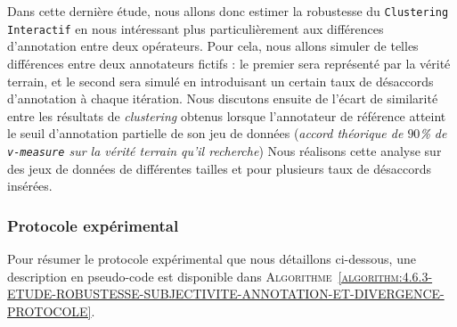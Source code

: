 		Dans cette dernière étude, nous allons donc estimer la robustesse du \texttt{Clustering Interactif} en nous intéressant plus particulièrement aux différences d'annotation entre deux opérateurs.
		Pour cela, nous allons simuler de telles différences entre deux annotateurs fictifs : le premier sera représenté par la vérité terrain, et le second sera simulé en introduisant un certain taux de désaccords d'annotation à chaque itération.
		Nous discutons ensuite de l'écart de similarité entre les résultats de \textit{clustering} obtenus lorsque l'annotateur de référence atteint le seuil d'annotation partielle de son jeu de données (\textit{accord théorique de $90$\% de \texttt{v-measure} sur la vérité terrain qu'il recherche})
		Nous réalisons cette analyse sur des jeux de données de différentes tailles et pour plusieurs taux de désaccords insérées.
	
		\subsubsection{Protocole expérimental}
			
			Pour résumer le protocole expérimental que nous détaillons ci-dessous, une description en pseudo-code est disponible dans \textsc{Algorithme~\ref{algorithm:4.6.3-ETUDE-ROBUSTESSE-SUBJECTIVITE-ANNOTATION-ET-DIVERGENCE-PROTOCOLE}}.
			
